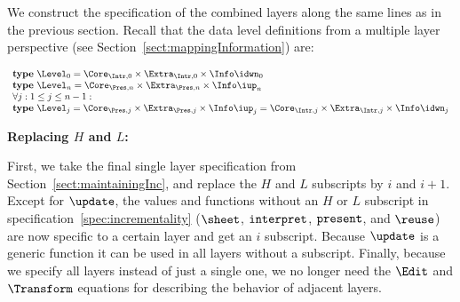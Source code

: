 We construct the specification of the combined layers along the same lines as in the previous section. Recall that the data level definitions from a multiple layer perspective (see Section~\ref{sect:mappingInformation}) are:

\begin{small}\( \begin{array}{lcl}  \label{inv:incrementality}
\text{\bf type}~\Level_{0}  =  \Core_{\Intr,0} \times \Extra_{\Intr,0} \times \Info\idwn_{0} \\
\text{\bf type}~\Level_{n}  =  \Core_{\Pres,n} \times \Extra_{\Pres,n} \times  \Info\iup_{n}\\
\lefteqn{\forall j:1 \le j \le n-1:}  \\
\text{\bf type}~\Level_{j} =  \Core_{\Pres,j} \times \Extra_{\Pres,j}  \times \Info\iup_{j}   
                                       =  \Core_{\Intr,j} \times \Extra_{\Intr,j} \times \Info\idwn_{j}
\end{array}\)\end{small}

\bigskip
{\bf Replacing $H$ and $L$:}

First, we take the  final single layer specification from Section~\ref{sect:maintainingInc}, and replace the $H$ and $L$ subscripts by $i$ and $i+1$. Except for $\update$, the values and functions without an $H$ or $L$ subscript in specification~\ref{spec:incrementality} ($\sheet$, ${\tt interpret}$, ${\tt present}$, and
 $\reuse$) are now specific to a certain layer and get an $i$ subscript. Because $\update$ is a generic function it can be used in all layers without a subscript. Finally, because we specify all layers instead of just a single one, we no longer need the $\Edit$ and $\Transform$ equations for describing the behavior of adjacent layers.

